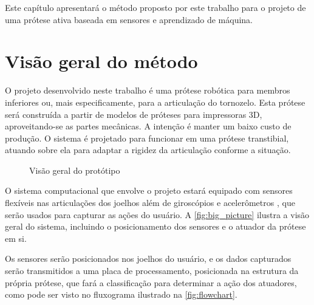 Este capítulo apresentará o método proposto por este trabalho para o projeto de uma prótese ativa baseada em sensores e aprendizado de máquina.

\section{Visão geral do método}\label{sec:metodo_protese}

O projeto desenvolvido neste trabalho é uma prótese robótica para membros inferiores ou, mais especificamente, para a articulação do tornozelo. Esta prótese será construída a partir de modelos de próteses para impressoras 3D, aproveitando-se as partes mecânicas. A intenção é manter um baixo custo de produção. O sistema é projetado para funcionar em uma prótese transtibial, atuando sobre ela para adaptar a rigidez da articulação conforme a situação.

\begin{figure}[h]
	\caption{\label{fig:big_picture}Visão geral do protótipo}
	\begin{center}
	\end{center}
\end{figure}

O sistema computacional que envolve o projeto estará equipado com sensores flexíveis \cite{flex:datasheet} nas articulações dos joelhos além de giroscópios e acelerômetros \cite{invensense:imu_mpu}, que serão usados para capturar as ações do usuário. A \autoref{fig:big_picture} ilustra a visão geral do sistema, incluindo o posicionamento dos sensores e o atuador da prótese em si.

Os sensores serão posicionados nos joelhos do usuário, e os dados capturados serão transmitidos a uma placa de processamento, posicionada na estrutura da própria prótese, que fará a classificação para determinar a ação dos atuadores, como pode ser visto no fluxograma ilustrado na \autoref{fig:flowchart}.


